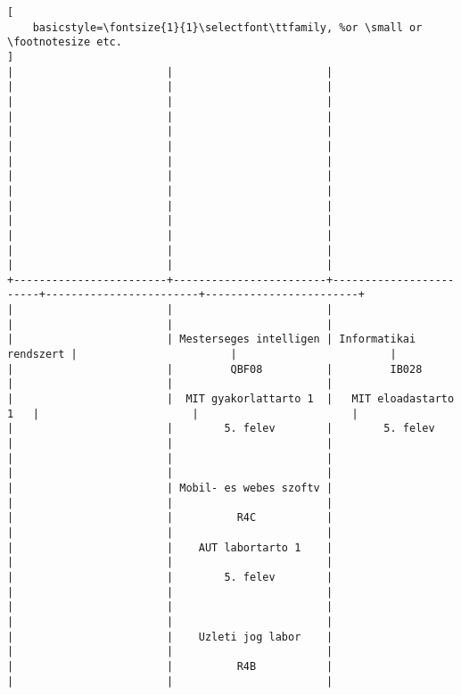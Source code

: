 \begin{lstlisting}[
    basicstyle=\fontsize{1}{1}\selectfont\ttfamily, %or \small or \footnotesize etc.
]
|                        |                        |                        |                        |                        | 
|                        |                        |                        |                        |                        | 
|                        |                        |                        |                        |                        | 
|                        |                        |                        |                        |                        | 
|                        |                        |                        |                        |                        | 
|                        |                        |                        |                        |                        | 
|                        |                        |                        |                        |                        | 
+------------------------+------------------------+------------------------+------------------------+------------------------+
|                        |                        |                        |                        |                        | 
|                        | Mesterseges intelligen | Informatikai rendszert |                        |                        | 
|                        |         QBF08          |         IB028          |                        |                        | 
|                        |  MIT gyakorlattarto 1  |   MIT eloadastarto 1   |                        |                        | 
|                        |        5. felev        |        5. felev        |                        |                        | 
|                        |                        |                        |                        |                        | 
|                        | Mobil- es webes szoftv |                        |                        |                        | 
|                        |          R4C           |                        |                        |                        | 
|                        |    AUT labortarto 1    |                        |                        |                        | 
|                        |        5. felev        |                        |                        |                        | 
|                        |                        |                        |                        |                        | 
|                        |    Uzleti jog labor    |                        |                        |                        | 
|                        |          R4B           |                        |                        |                        | 

\end{lstlisting}

